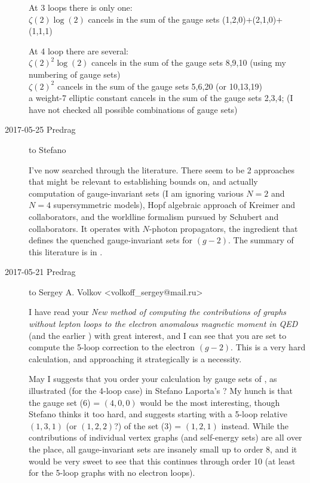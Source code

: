 \begin{description}
At 3 loops there is only one:\\
$\zeta(2)\log(2)$ cancels in the sum of  the gauge sets
(1,2,0)+(2,1,0)+(1,1,1)

At 4 loop there are several:\\
$\zeta(2)^2\log(2)$ cancels in the sum of the gauge sets 8,9,10
(using my numbering of gauge sets) \\
$\zeta(2)^2$        cancels in the sum
of the gauge sets 5,6,20 (or 10,13,19) \\
a weight-7 elliptic constant
cancels in the sum of the gauge sets 2,3,4;
(I have not checked all possible combinations of gauge sets)


\item[2017-05-25 Predrag] to Stefano

I've now searched through the literature. There seem to be 2 approaches
that might be relevant to establishing bounds on, and actually
computation of gauge-invariant sets (I am ignoring various $N=2$ and
$N=4$ supersymmetric models), Hopf algebraic approach of Kreimer and
collaborators, and the worldline formalism pursued by Schubert and
collaborators. It operates with $N$-photon propagators, the ingredient
that defines the quenched gauge-invariant sets for $(g-2)$. The summary
of this literature is in .

\item[2017-05-21 Predrag] to
Sergey  A. Volkov <volkoff\_sergey@mail.ru>
%

I have read your
{\em New method of computing the contributions of graphs without lepton
loops to the electron anomalous magnetic moment in {QED}}
(and the earlier ) with great interest, and I can see
that you are set to compute the 5-loop correction to the electron
$(g-2)$. This is a very hard calculation, and approaching it
strategically is a necessity.

May I suggests that you order your calculation by gauge sets of
, as illustrated (for the 4-loop case) in Stefano
Laporta's ? My hunch is that the gauge
set (6) = $(4,0,0)$ would be the most interesting, though Stefano thinks
it too hard, and suggests starting with a 5-loop relative $(1,3,1)$ (or
$(1,2,2)$?) of the set (3) = $(1,2,1)$ instead. While the contributions
of individual vertex graphs (and self-energy sets) are all
over the place, all gauge-invariant sets are insanely small up to order
8, and it would be very sweet to see that this continues through order 10
(at least for the 5-loop graphs with no electron loops).


\end{description}
